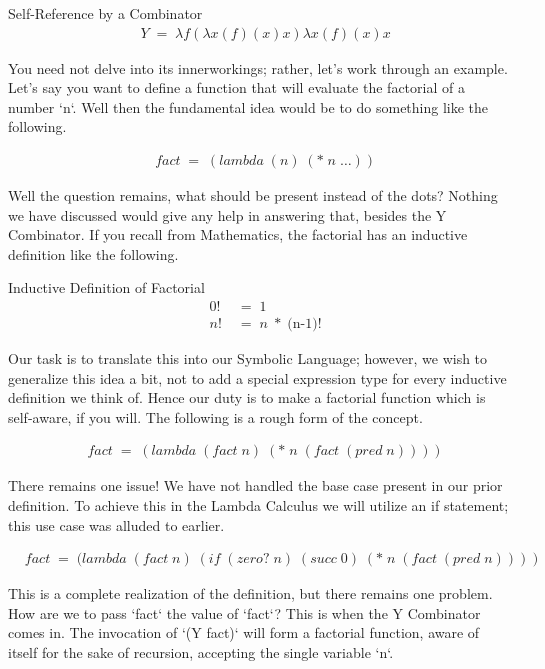 Self-Reference by a Combinator
\begin{align*}
& Y \; = \; λf(λx(f)(x)x)λx(f)(x)x
\end{align*}

You need not delve into its innerworkings; rather, let's work through an example. 
Let's say you want to define a function that will evaluate the factorial of a 
number `n`. Well then the fundamental idea would be to do something like the 
following.

\begin{align*}
& fact \; = \; (lambda \; (n) \; (* \; n \; \dots))
\end{align*}

Well the question remains, what should be present instead of the dots? Nothing we 
have discussed would give any help in answering that, besides the Y Combinator. If 
you recall from Mathematics, the factorial has an inductive definition like the 
following.

Inductive Definition of Factorial
\begin{align*}
& 0! \; &= \; 1
\\& n! \; &= \; n \; * \; (\text{n-1)!}
\end{align*}

Our task is to translate this into our Symbolic Language; however, we wish to 
generalize this idea a bit, not to add a special expression type for every 
inductive definition we think of. Hence our duty is to make a factorial function 
which is self-aware, if you will. The following is a rough form of the concept.

\begin{align*}
& fact \; = \; (lambda \; (fact \; n) \; (* \; n \; (fact \; (pred \; n))))
\end{align*}

There remains one issue! We have not handled the base case present in our prior 
definition. To achieve this in the Lambda Calculus we will utilize an if 
statement; this use case was alluded to earlier.

\begin{align*}
& fact \; = \; (lambda \; (fact \; n) \; (if \; (zero? \; n) \; (succ \; 0) \; (* \; n \; (fact \; (pred \; n))))
\end{align*}

This is a complete realization of the definition, but there remains one problem. 
How are we to pass `fact` the value of `fact`? This is when the Y Combinator comes 
in. The invocation of `(Y fact)` will form a factorial function, aware of itself 
for the sake of recursion, accepting the single variable `n`.


